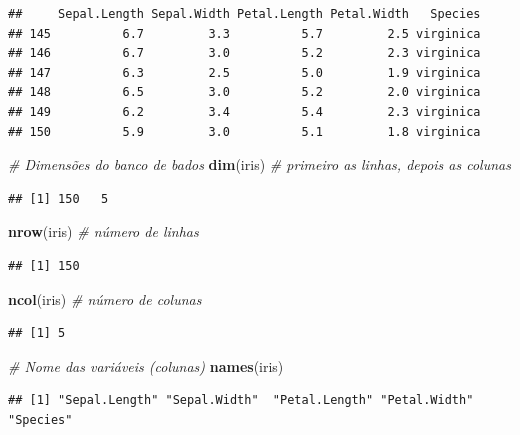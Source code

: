 \documentclass[
]{book}
\newenvironment{Shaded}{\begin{snugshade}}{\end{snugshade}}
\newcommand{\CommentTok}[1]{\textcolor[rgb]{0.56,0.35,0.01}{\textit{#1}}}
\newcommand{\FunctionTok}[1]{\textcolor[rgb]{0.13,0.29,0.53}{\textbf{#1}}}
\newcommand{\NormalTok}[1]{#1}
\begin{document}
\begin{verbatim}
##     Sepal.Length Sepal.Width Petal.Length Petal.Width   Species
## 145          6.7         3.3          5.7         2.5 virginica
## 146          6.7         3.0          5.2         2.3 virginica
## 147          6.3         2.5          5.0         1.9 virginica
## 148          6.5         3.0          5.2         2.0 virginica
## 149          6.2         3.4          5.4         2.3 virginica
## 150          5.9         3.0          5.1         1.8 virginica
\end{verbatim}

\begin{Shaded}
\begin{Highlighting}[]
\CommentTok{\# Dimensões do banco de bados}
\FunctionTok{dim}\NormalTok{(iris) }\CommentTok{\# primeiro as linhas, depois as colunas}
\end{Highlighting}
\end{Shaded}

\begin{verbatim}
## [1] 150   5
\end{verbatim}

\begin{Shaded}
\begin{Highlighting}[]
\FunctionTok{nrow}\NormalTok{(iris) }\CommentTok{\# número de linhas}
\end{Highlighting}
\end{Shaded}

\begin{verbatim}
## [1] 150
\end{verbatim}

\begin{Shaded}
\begin{Highlighting}[]
\FunctionTok{ncol}\NormalTok{(iris) }\CommentTok{\# número de colunas}
\end{Highlighting}
\end{Shaded}

\begin{verbatim}
## [1] 5
\end{verbatim}

\begin{Shaded}
\begin{Highlighting}[]
\CommentTok{\# Nome das variáveis (colunas)}
\FunctionTok{names}\NormalTok{(iris)}
\end{Highlighting}
\end{Shaded}

\begin{verbatim}
## [1] "Sepal.Length" "Sepal.Width"  "Petal.Length" "Petal.Width"  "Species"
\end{verbatim}
\end{document}
